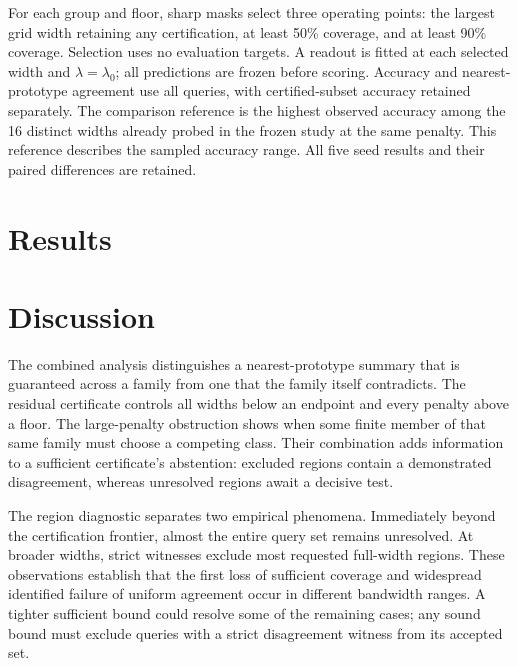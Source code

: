 \documentclass[preprint,12pt,authoryear]{elsarticle}
\begin{document}
For each group and floor, sharp masks select three operating points: the largest grid width retaining any certification, at least 50\% coverage, and at least 90\% coverage. Selection uses no evaluation targets. A readout is fitted at each selected width and $\lambda=\lambda_0$; all predictions are frozen before scoring. Accuracy and nearest-prototype agreement use all queries, with certified-subset accuracy retained separately. The comparison reference is the highest observed accuracy among the 16 distinct widths already probed in the frozen study at the same penalty. This reference describes the sampled accuracy range. All five seed results and their paired differences are retained.





\section{Results}






\section{Discussion}
The combined analysis distinguishes a nearest-prototype summary that is guaranteed across a family from one that the family itself contradicts. The residual certificate controls all widths below an endpoint and every penalty above a floor. The large-penalty obstruction shows when some finite member of that same family must choose a competing class. Their combination adds information to a sufficient certificate's abstention: excluded regions contain a demonstrated disagreement, whereas unresolved regions await a decisive test.

The region diagnostic separates two empirical phenomena. Immediately beyond the certification frontier, almost the entire query set remains unresolved. At broader widths, strict witnesses exclude most requested full-width regions. These observations establish that the first loss of sufficient coverage and widespread identified failure of uniform agreement occur in different bandwidth ranges. A tighter sufficient bound could resolve some of the remaining cases; any sound bound must exclude queries with a strict disagreement witness from its accepted set.
\end{document}
